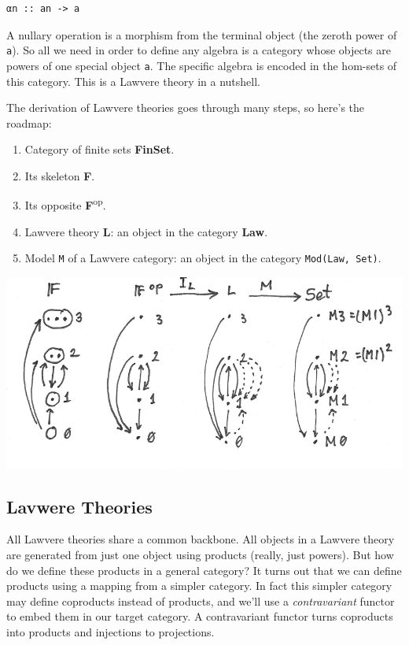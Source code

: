 \begin{verbatim}
αn :: an -> a
\end{verbatim}

A nullary operation is a morphism from the terminal object (the zeroth
power of \texttt{a}). So all we need in order to define any algebra is a
category whose objects are powers of one special object \texttt{a}. The
specific algebra is encoded in the hom-sets of this category. This is a
Lawvere theory in a nutshell.

The derivation of Lawvere theories goes through many steps, so here's
the roadmap:

\begin{enumerate}
\tightlist
\item
  Category of finite sets \textbf{FinSet}.
\item
  Its skeleton \textbf{F}.
\item
  Its opposite \textbf{F}\textsuperscript{op}.
\item
  Lawvere theory \textbf{L}: an object in the category \textbf{Law}.
\item
  Model \texttt{M} of a Lawvere category: an object in the category
  \texttt{Mod(Law,\ Set)}.
\end{enumerate}

\includegraphics[width=5.31250in]{images/lawvere1.png}

\subsection{Lavwere Theories}\label{lavwere-theories}

All Lawvere theories share a common backbone. All objects in a Lawvere
theory are generated from just one object using products (really, just
powers). But how do we define these products in a general category? It
turns out that we can define products using a mapping from a simpler
category. In fact this simpler category may define coproducts instead of
products, and we'll use a \emph{contravariant} functor to embed them in
our target category. A contravariant functor turns coproducts into
products and injections to projections.

